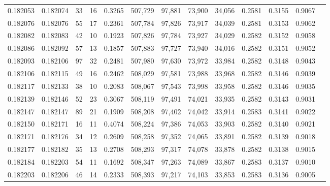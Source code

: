 \begin{tabular}{rrrrrrrrrrrrr}
0.182053 & 0.182074 &    33 &  16 &                                     0.3265 & 507,729 &  97,881 &  73,900 &  34,056 & 0.2581 & 0.3155 & 0.9067 \\
0.182076 & 0.182076 &    55 &  17 &                                     0.2361 & 507,784 &  97,826 &  73,917 &  34,039 & 0.2581 & 0.3153 & 0.9062 \\
0.182082 & 0.182083 &    42 &  10 &                                     0.1923 & 507,826 &  97,784 &  73,927 &  34,029 & 0.2582 & 0.3152 & 0.9058 \\
0.182086 & 0.182092 &    57 &  13 &                                     0.1857 & 507,883 &  97,727 &  73,940 &  34,016 & 0.2582 & 0.3151 & 0.9052 \\
0.182093 & 0.182106 &    97 &  32 &                                     0.2481 & 507,980 &  97,630 &  73,972 &  33,984 & 0.2582 & 0.3148 & 0.9043 \\
0.182106 & 0.182115 &    49 &  16 &                                     0.2462 & 508,029 &  97,581 &  73,988 &  33,968 & 0.2582 & 0.3146 & 0.9039 \\
0.182117 & 0.182133 &    38 &  10 &                                     0.2083 & 508,067 &  97,543 &  73,998 &  33,958 & 0.2582 & 0.3146 & 0.9035 \\
0.182139 & 0.182146 &    52 &  23 &                                     0.3067 & 508,119 &  97,491 &  74,021 &  33,935 & 0.2582 & 0.3143 & 0.9031 \\
0.182147 & 0.182147 &    89 &  21 &                                     0.1909 & 508,208 &  97,402 &  74,042 &  33,914 & 0.2583 & 0.3141 & 0.9022 \\
0.182150 & 0.182171 &    16 &  11 &                                     0.4074 & 508,224 &  97,386 &  74,053 &  33,903 & 0.2582 & 0.3140 & 0.9021 \\
0.182171 & 0.182176 &    34 &  12 &                                     0.2609 & 508,258 &  97,352 &  74,065 &  33,891 & 0.2582 & 0.3139 & 0.9018 \\
0.182177 & 0.182182 &    35 &  13 &                                     0.2708 & 508,293 &  97,317 &  74,078 &  33,878 & 0.2582 & 0.3138 & 0.9015 \\
0.182184 & 0.182203 &    54 &  11 &                                     0.1692 & 508,347 &  97,263 &  74,089 &  33,867 & 0.2583 & 0.3137 & 0.9010 \\
0.182203 & 0.182206 &    46 &  14 &                                     0.2333 & 508,393 &  97,217 &  74,103 &  33,853 & 0.2583 & 0.3136 & 0.9005 \\

\end{tabular}
